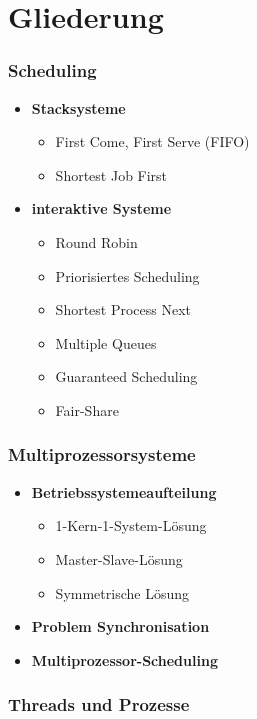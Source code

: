 \section{Gliederung}
\begin{frame}
	\frametitle{Scheduling}
	\begin{itemize}
		\item<1-> \textbf{Stacksysteme}
		\begin{itemize}[<+->]
			\item First Come, First Serve (FIFO)
			\item Shortest Job First
		\end{itemize}
		\item<3-> \textbf{interaktive Systeme}
		\begin{itemize}[<+->]
			\item Round Robin
			\item Priorisiertes Scheduling
			\item Shortest Process Next
			\item Multiple Queues
			\item Guaranteed Scheduling
			\item Fair-Share
		\end{itemize}
	\end{itemize}
\end{frame}

\begin{frame}
	\frametitle{Multiprozessorsysteme}
	\begin{itemize}
		\item<1-> \textbf{Betriebssystemeaufteilung}
		\begin{itemize}[<+->]
			\item 1-Kern-1-System-Lösung
			\item Master-Slave-Lösung
			\item Symmetrische Lösung
		\end{itemize}
		\item<4-> \textbf{Problem Synchronisation}
		\item<5-> \textbf{Multiprozessor-Scheduling}
	\end{itemize}
\end{frame}

\begin{frame}
	\frametitle{Threads und Prozesse}
\end{frame}

